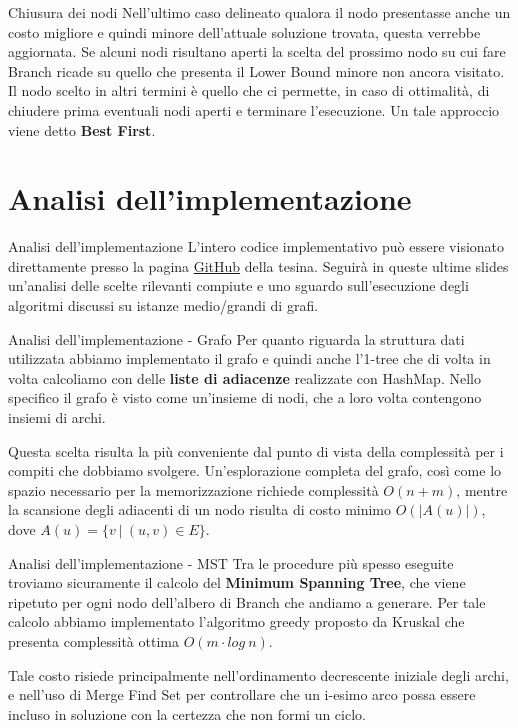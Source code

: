 \documentclass[10pt]{beamer}
\begin{document}
\begin{frame}{Chiusura dei nodi}
    Nell'ultimo caso delineato qualora il nodo presentasse anche un costo migliore e quindi minore dell'attuale soluzione trovata, questa verrebbe aggiornata.
    \newline
    \newline
    Se alcuni nodi risultano aperti la scelta del prossimo nodo su cui fare Branch ricade su quello che presenta il Lower Bound minore non ancora visitato.\newline
    Il nodo scelto in altri termini è quello che ci permette, in caso di ottimalità, di chiudere prima eventuali nodi aperti e terminare l'esecuzione. Un tale approccio viene detto \textbf{Best First}.
\end{frame}

\section{Analisi dell'implementazione}
\begin{frame}{Analisi dell'implementazione}
    L'intero codice implementativo può essere visionato direttamente presso la pagina \href{https://github.com/LorenzoSciandra/TesinaOttimizzazioneCombinatoria}{GitHub} della tesina. Seguirà in queste ultime slides un'analisi delle scelte rilevanti compiute e uno sguardo sull'esecuzione degli algoritmi discussi su istanze medio/grandi di grafi.
\end{frame}

\begin{frame}{Analisi dell'implementazione - Grafo}
    Per quanto riguarda la struttura dati utilizzata abbiamo implementato il grafo e quindi anche l'1-tree che di volta in volta calcoliamo con delle \textbf{liste di adiacenze} realizzate con HashMap.\newline
    Nello specifico il grafo è visto come un'insieme di nodi, che a loro volta contengono insiemi di archi.
    
    Questa scelta risulta la più conveniente dal punto di vista della complessità per i compiti che dobbiamo svolgere. Un'esplorazione completa del grafo, così come lo spazio necessario per la memorizzazione richiede complessità $O(n+m)$, mentre la scansione degli adiacenti di un nodo risulta di costo minimo $O(|A(u)|)$, dove $A(u) = \{v \:|\: (u,v) \in E\}$.
\end{frame}

\begin{frame}{Analisi dell'implementazione - MST}
    Tra le procedure più spesso eseguite troviamo sicuramente il calcolo del \textbf{Minimum Spanning Tree}, che viene ripetuto per ogni nodo dell'albero di Branch che andiamo a generare. Per tale calcolo abbiamo implementato l'algoritmo greedy proposto da Kruskal che presenta complessità ottima $O(m\cdot log\:n)$.
    
    Tale costo risiede principalmente nell'ordinamento decrescente iniziale degli archi, e nell'uso di Merge Find Set per controllare che un i-esimo arco possa essere incluso in soluzione con la certezza che non formi un ciclo.
\end{frame}
\end{document}
